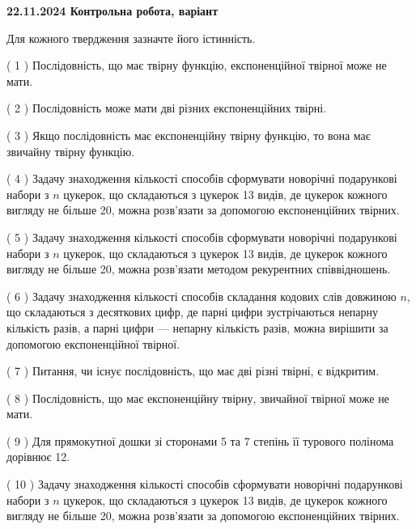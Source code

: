 \documentclass[12pt, ukrainian]{article}
\begin{document}
\vspace{4mm}
\newpage
\begin {large}

\textbf{22.11.2024 Контрольна робота, варіант  }\par


{
Для кожного твердження зазначте його істинність.\par
\vspace{2mm}
( 1 ) Послідовність, що має твірну функцію, експоненційної твірної може не мати.%

( 2 ) Послідовність може мати дві різних експоненційних твірні.%

( 3 ) Якщо послідовність має експоненційну твірну функцію, то вона має звичайну твірну функцію.%

( 4 ) Задачу знаходження кількості способів сформувати новорічні подарункові набори з $n$ цукерок, що складаються з цукерок 13 видів, де цукерок кожного вигляду не більше 20, можна розв’язати за допомогою експоненційних твірних.%

( 5 ) Задачу знаходження кількості способів сформувати новорічні подарункові набори з $n$ цукерок, що складаються з цукерок 13 видів, де цукерок кожного вигляду не більше 20, можна розв’язати методом рекурентних співвідношень.%

( 6 ) Задачу знаходження кількості способів складання кодових слів довжиною $n$, що складаються з десяткових цифр, де парні цифри зустрічаються непарну кількість разів, а парні цифри — непарну кількість разів, можна вирішити за допомогою експоненційної твірної.%

( 7 ) Питання, чи існує послідовність, що має дві різні твірні, є відкритим.%

( 8 ) Послідовність, що має експоненційну твірну, звичайної твірної може не мати.%

( 9 ) Для прямокутної дошки зі сторонами 5 та 7 степінь її турового полінома дорівнює 12.%

( 10 ) Задачу знаходження кількості способів сформувати новорічні подарункові набори з $n$ цукерок, що складаються з цукерок 13 видів, де цукерок кожного вигляду не більше 20, можна розв’язати за допомогою експоненційних твірних.%


\vspace{5mm}
}
\end {large}
\end{document}
